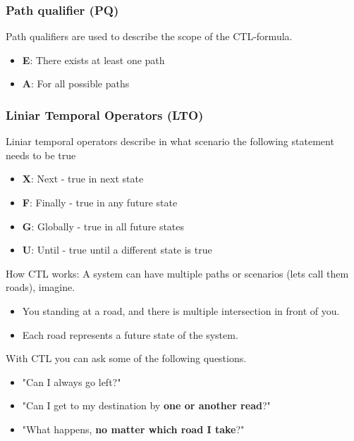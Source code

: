 \subsubsection{Path qualifier (PQ)}
Path qualifiers are used to describe the scope of the CTL-formula. %
\begin{itemize}
    \item \textbf{E}: There exists at least one path
    \item \textbf{A}: For all possible paths
\end{itemize}

\subsubsection{Liniar Temporal Operators (LTO)}
Liniar temporal operators describe in what scenario the following statement needs to be true
\begin{itemize}
    \item \textbf{X}: Next - true in next state
    \item \textbf{F}: Finally - true in any future state
    \item \textbf{G}: Globally - true in all future states
    \item \textbf{U}: Until - true until a different state is true
\end{itemize}

\medskip

How CTL works: A system can have multiple paths or scenarios (lets call them roads), imagine.
\begin{itemize}
    \item[] You standing at a road, and there is multiple intersection in front of you.
    \item[] Each road represents a future state of the system.
\end{itemize}
With CTL you can ask some of the following questions.
\begin{itemize}
    \item[] "Can I always go left?"
    \item[] "Can I get to my destination by \textbf{one or another read}?"
    \item[] "What happens, \textbf{no matter which road I take}?"
\end{itemize}

\medskip








